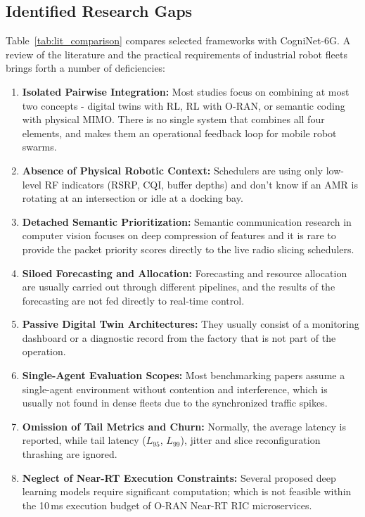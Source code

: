\documentclass[twocolumn,10pt,twoside]{article}
\begin{document}
\subsection{Identified Research Gaps}
Table~\ref{tab:lit_comparison} compares selected frameworks with CogniNet-6G. A review of the literature and the practical requirements of industrial robot fleets brings forth a number of deficiencies:
\begin{enumerate}
    \item \textbf{Isolated Pairwise Integration:} Most studies focus on combining at most two concepts - digital twins with RL, RL with O-RAN, or semantic coding with physical MIMO. There is no single system that combines all four elements, and makes them an operational feedback loop for mobile robot swarms.
    \item \textbf{Absence of Physical Robotic Context:} Schedulers are using only low-level RF indicators (RSRP, CQI, buffer depths) and don't know if an AMR is rotating at an intersection or idle at a docking bay.
    \item \textbf{Detached Semantic Prioritization:} Semantic communication research in computer vision focuses on deep compression of features and it is rare to provide the packet priority scores directly to the live radio slicing schedulers.
    \item \textbf{Siloed Forecasting and Allocation:} Forecasting and resource allocation are usually carried out through different pipelines, and the results of the forecasting are not fed directly to real-time control.
    \item \textbf{Passive Digital Twin Architectures:} They usually consist of a monitoring dashboard or a diagnostic record from the factory that is not part of the operation.
    \item \textbf{Single-Agent Evaluation Scopes:} Most benchmarking papers assume a single-agent environment without contention and interference, which is usually not found in dense fleets due to the synchronized traffic spikes.
    \item \textbf{Omission of Tail Metrics and Churn:} Normally, the average latency is reported, while tail latency ($L_{95}$, $L_{99}$), jitter and slice reconfiguration thrashing are ignored.
    \item \textbf{Neglect of Near-RT Execution Constraints:} Several proposed deep learning models require significant computation; which is not feasible within the 10\,ms execution budget of O-RAN Near-RT RIC microservices.
\end{enumerate}
\end{document}
